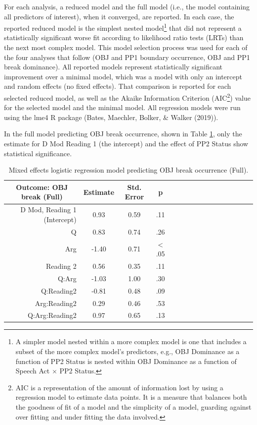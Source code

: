 \documentclass[11pt,oneside]{book}
\let\rmarkdownfootnote\footnote%
\def\footnote{\protect\rmarkdownfootnote}
\begin{document}
For each analysis, a reduced model and the full model (i.e., the model containing all predictors of interest), when it converged, are reported. In each case, the reported reduced model is the simplest nested model\footnote{A simpler model nested within a more complex model is one that includes a subset of the more complex model's predictors, e.g., OBJ Dominance as a function of PP2 Status is nested within OBJ Dominance as a function of Speech Act \(\times\) PP2 Status.} that did not represent a statistically significant worse fit according to likelihood ratio tests (LRTs) than the next most complex model. This model selection process was used for each of the four analyses that follow (OBJ and PP1 boundary occurrence, OBJ and PP1 break dominance). All reported models represent statistically significant improvement over a minimal model, which was a model with only an intercept and random effects (no fixed effects). That comparison is reported for each selected reduced model, as well as the Akaike Information Criterion (AIC\footnote{AIC is a representation of the amount of information lost by using a regression model to estimate data points. It is a measure that balances both the goodness of fit of a model and the simplicity of a model, guarding against over fitting and under fitting the data involved.}) value for the selected model and the minimal model. All regression models were run using the lme4 R package (Bates, Maechler, Bolker, \& Walker (2019)).

In the full model predicting OBJ break occurrence, shown in Table \ref{tab:fullobjmod}, only the estimate for D Mod Reading 1 (the intercept) and the effect of PP2 Status show statistical significance.

\begin{table}[!h]

\caption{\label{tab:fullobjmod}Mixed effects logistic regression model predicting OBJ break occurrence (Full).}
\centering
\begin{tabular}{rcccrcccrcccrccc}
\toprule
\multicolumn{1}{c}{Outcome: OBJ break (Full)} & \multicolumn{1}{c}{Estimate} & \multicolumn{1}{c}{Std. Error} & \multicolumn{1}{c}{p}\\
\midrule
D Mod, Reading 1 (Intercept) & 0.93 & 0.59 & .11\\
Q & 0.83 & 0.74 & .26\\
Arg & -1.40 & 0.71 & < .05\\
Reading 2 & 0.56 & 0.35 & .11\\
Q:Arg & -1.03 & 1.00 & .30\\
\addlinespace
Q:Reading2 & -0.81 & 0.48 & .09\\
Arg:Reading2 & 0.29 & 0.46 & .53\\
Q:Arg:Reading2 & 0.97 & 0.65 & .13\\
\bottomrule
\end{tabular}
\end{table}
\end{document}
